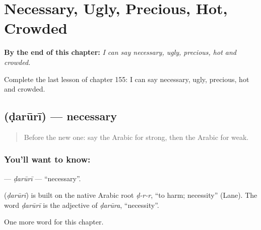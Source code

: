 
\chapter{Necessary, Ugly, Precious, Hot, Crowded}
\label{ch:ar-necessary-ugly-precious-hot-crowded}

\begin{chapteropening}
\textbf{By the end of this chapter:} \emph{I can say necessary, ugly, precious, hot and crowded.}

Complete the last lesson of chapter 155: I can say necessary, ugly, precious, hot and crowded.
\end{chapteropening}

\section[\texorpdfstring{\ar{ضروري} (ḍarūrī)}{ضروري (ḍarūrī)}]{ (ḍarūrī) — necessary}

\label{lesson:AR-C155-daruri}



\begin{quote}
Before the new one: say the Arabic for strong, then the Arabic for weak.
\end{quote}

\subsection*{You'll want to know: }
\textbf{} — \emph{ḍarūrī} — \textquotedblleft{}necessary\textquotedblright{}.

\begin{cousinweb}
\textbf{} (\emph{ḍarūrī}) is built on the native Arabic root \emph{ḍ-r-r}, \textquotedblleft{}to harm; necessity\textquotedblright{} (Lane). The word \emph{ḍarūrī} is the adjective of \emph{ḍarūra}, \textquotedblleft{}necessity\textquotedblright{}.
\end{cousinweb}

\begin{grammarlens}[title={What you've built}]
One more word for this chapter.
\end{grammarlens}


